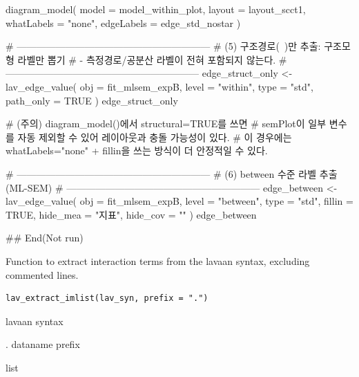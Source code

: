 \documentclass[a4paper]{book}
\begin{document}
\begin{Examples}
\begin{ExampleCode}
diagram_model(
  model      = model_within_plot,
  layout     = layout_scct1,
  whatLabels = "none",
  edgeLabels = edge_std_nostar
)

# ------------------------------------------------------------
# (5) 구조경로(~)만 추출: 구조모형 라벨만 뽑기
#     - 측정경로/공분산 라벨이 전혀 포함되지 않는다.
# ------------------------------------------------------------
edge_struct_only <- lav_edge_value(
  obj       = fit_mlsem_expB,
  level     = "within",
  type      = "std",
  path_only = TRUE
)
edge_struct_only

# (주의) diagram_model()에서 structural=TRUE를 쓰면
# semPlot이 일부 변수를 자동 제외할 수 있어 레이아웃과 충돌 가능성이 있다.
# 이 경우에는 whatLabels="none" + fillin을 쓰는 방식이 더 안정적일 수 있다.

# ------------------------------------------------------------
# (6) between 수준 라벨 추출 (ML-SEM)
# ------------------------------------------------------------
edge_between <- lav_edge_value(
  obj   = fit_mlsem_expB,
  level = "between",
  type  = "std",
  fillin   = TRUE,
  hide_mea = "지표",
  hide_cov = ""
)
edge_between

## End(Not run)
\end{ExampleCode}
\end{Examples}
%
\begin{Description}
Function to extract interaction terms from the lavaan syntax,
excluding commented lines.
\end{Description}
%
\begin{Usage}
\begin{verbatim}
lav_extract_imlist(lav_syn, prefix = ".")
\end{verbatim}
\end{Usage}
%
\begin{Arguments}
\begin{ldescription}
\item[\code{lav\_syn}] lavaan syntax

\item[\code{prefix}] . dataname prefix
\end{ldescription}
\end{Arguments}
%
\begin{Value}
list
\end{Value}
%
\end{document}
